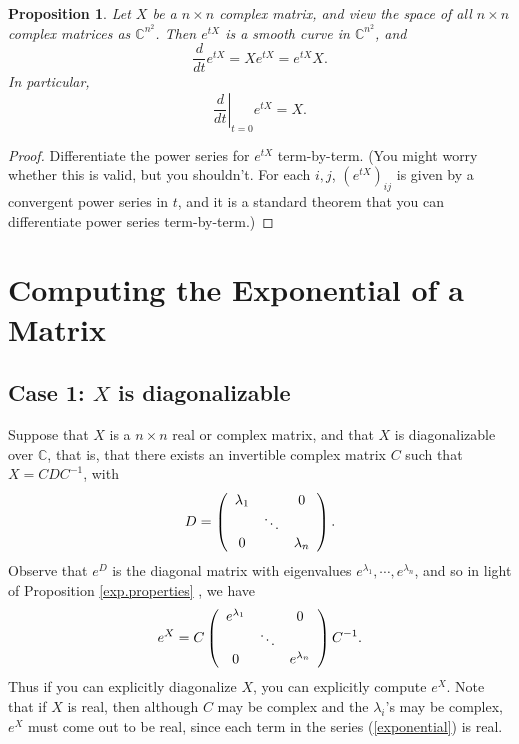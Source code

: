 \documentclass[12pt]{amsbook}
\theoremstyle{plain}
\newtheorem{proposition}[theorem]{Proposition}
\numberwithin{equation}{chapter}
\numberwithin{theorem}{chapter}
\begin{document}
\begin{proposition}
\label{derivative}Let $X$ be a $n\times n$ complex matrix, and view the space
of all $n\times n$ complex matrices as $\mathbb{C}^{n^{2}}$. Then $e^{tX}$ is
a smooth curve in $\mathbb{C}^{n^{2}}$, and
\[
\frac{d}{dt}e^{tX}=Xe^{tX}=e^{tX}X\text{.}%
\]
In particular,
\[
\left.  \frac{d}{dt}\right|  _{t=0}e^{tX}=X\text{.}%
\]
\end{proposition}

\begin{proof}
Differentiate the power series for $e^{tX}$ term-by-term. (You might worry
whether this is valid, but you shouldn't. For each $i,j$, $\left(
e^{tX}\right)  _{ij}$ is given by a convergent power series in $t$, and it is
a standard theorem that you can differentiate power series term-by-term.)
\end{proof}

\section{Computing the Exponential of a Matrix\label{computing}}

\subsection{Case 1: $X$ is diagonalizable}

Suppose that $X$ is a $n\times n$ real or complex matrix, and that $X$ is
diagonalizable over $\mathbb{C}$, that is, that there exists an invertible
complex matrix $C$ such that $X=CDC^{-1}$, with
\[
D=\left(
\begin{array}
[c]{ccc}%
\lambda_{1} &  & 0\\
& \ddots & \\
0 &  & \lambda_{n}%
\end{array}
\right)  \text{.}%
\]
Observe that $e^{D}$ is the diagonal matrix with eigenvalues $e^{\lambda_{1}%
},\cdots,e^{\lambda_{n}}$, and so in light of Proposition \ref{exp.properties}%
, we have
\[
e^{X}=C\left(
\begin{array}
[c]{ccc}%
e^{\lambda_{1}} &  & 0\\
& \ddots & \\
0 &  & e^{\lambda_{n}}%
\end{array}
\right)  C^{-1}\text{.}%
\]
Thus if you can explicitly diagonalize $X$, you can explicitly compute $e^{X}%
$. Note that if $X$ is real, then although $C$ may be complex and the
$\lambda_{i}$'s may be complex, $e^{X}$ must come out to be real, since each
term in the series (\ref{exponential}) is real.
\end{document}
